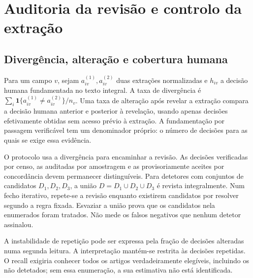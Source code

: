 
\section{Auditoria da revisão e controlo da extração}
\label{sec:mat-auditoria-revisao}

\subsection{Divergência, alteração e cobertura humana}
\label{sec:mat-auditoria-taxas}
Para um campo $v$, sejam $a_{iv}^{(1)},a_{iv}^{(2)}$ duas extrações normalizadas e $h_{iv}$ a decisão humana fundamentada no texto integral. A taxa de divergência é $\sum_i\mathbf1\{a_{iv}^{(1)}\neq a_{iv}^{(2)}\}/n_v$. Uma taxa de alteração após revelar a extração compara a decisão humana anterior e posterior à revelação, usando apenas decisões efetivamente obtidas sem acesso prévio à extração. A fundamentação por passagem verificável tem um denominador próprio: o número de decisões para as quais se exige essa evidência.

O protocolo usa a divergência para encaminhar a revisão. As decisões verificadas por censo, as auditadas por amostragem e as provisoriamente aceites por concordância devem permanecer distinguíveis. Para detetores com conjuntos de candidatos $D_1,D_2,D_3$, a união $D=D_1\cup D_2\cup D_3$ é revista integralmente. Num fecho iterativo, repete-se a revisão enquanto existirem candidatos por resolver segundo a regra fixada. Esvaziar a união prova que os candidatos nela enumerados foram tratados. Não mede os falsos negativos que nenhum detetor assinalou.

A instabilidade de repetição pode ser expressa pela fração de decisões alteradas numa segunda leitura. A interpretação mantém-se restrita às decisões repetidas. O recall exigiria conhecer todos os artigos verdadeiramente elegíveis, incluindo os não detetados; sem essa enumeração, a sua estimativa não está identificada.

